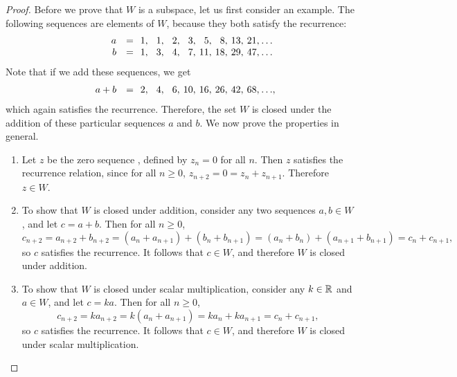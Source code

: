 \begin{proof}
  \def\x#1{\makebox[1.2em][r]{$#1$}}
  \def\y#1{\makebox[3em][r]{$#1$}}
  \def\z#1{\makebox[0em][l]{$#1$}}
  Before we prove that $W$ is a subspace, let us first consider an
  example. The following sequences are elements of\/ $W$, because they
  both satisfy the recurrence:
  \begin{equation*}
    \begin{array}{rc@{}l}
      \y{a} &=& \x{1},\x{1},\x{2},\x{3},\x{5},\x{8},\x{13},\x{21},\x{\ldots} \\
      \y{b} &=& \x{1},\x{3},\x{4},\x{7},\x{11},\x{18},\x{29},\x{47},\x{\ldots}
    \end{array}
  \end{equation*}
  Note that if we add these sequences, we get
  \begin{equation*}
    \begin{array}{rc@{}l}
      \y{a+b} &=& \x{2},\x{4},\x{6},\x{10},\x{16},\x{26},\x{42},\x{68},\x{\ldots}\z{,} \\
    \end{array}
  \end{equation*}
  which again satisfies the recurrence. Therefore, the set $W$ is
  closed under the addition of these particular sequences $a$ and
  $b$. We now prove the properties in general.
  \begin{enumerate}
  \item Let $z$ be the zero sequence%
    , defined by $z_n=0$ for all $n$.
    Then $z$ satisfies the recurrence relation, since for all $n\geq 0$,
    $z_{n+2}=0=z_n+z_{n+1}$. Therefore $z\in W$.
  \item To show that $W$ is closed under addition, consider any two
    sequences $a,b\in W$, and let $c=a+b$. Then for all $n\geq 0$,
    \begin{equation*}
      c_{n+2}
      = a_{n+2} + b_{n+2}
      = (a_n + a_{n+1}) + (b_n + b_{n+1})
      = (a_n + b_n) + (a_{n+1} + b_{n+1})
      = c_n + c_{n+1},
    \end{equation*}
    so $c$ satisfies the recurrence. It follows that $c\in W$, and
    therefore $W$ is closed under addition.
  \item To show that $W$ is closed under scalar multiplication,
    consider any $k\in\mathbb{R}$ and $a\in W$, and let $c=ka$. Then for all
    $n\geq 0$,
    \begin{equation*}
      c_{n+2}
      = ka_{n+2}
      = k(a_n + a_{n+1})
      = ka_n + ka_{n+1}
      = c_n + c_{n+1},
    \end{equation*}
    so $c$ satisfies the recurrence. It follows that $c\in W$, and
    therefore $W$ is closed under scalar multiplication.
  \end{enumerate}
\end{proof}

